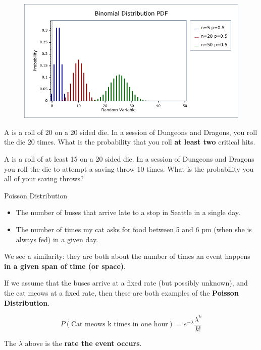 %
\begin{frame}

  \begin{figure}
    \includegraphics[scale=0.5]{binomial-pdf-changing-n}
  \end{figure}

\end{frame}
%

%
\begin{frame}

A  is a roll of 20 on a 20 sided die.  In a session of
Dungeons and Dragons, you roll the die 20 times.  What is the probability that
you roll \textbf{at least two} critical hits.

\hfill

A  is a roll of at least 15 on a 20 sided die.  In a session
of Dungeons and Dragons you roll the die to attempt a saving throw 10 times.
What is the probability you  all of your saving throws?

\end{frame}
%

%
\begin{frame}{Poisson Distribution}

\begin{itemize}
\item The number of buses that arrive late to a stop in Seattle in a single
day.
\item The number of times my cat asks for food between 5 and 6 pm (when she is
always fed) in a given day.
\end{itemize}

We see a similarity: they are both about the number of times an event happens
\textbf{in a given span of time (or space)}.
\end{frame}
%

%
\begin{frame}
If we assume that the buses arrive at a fixed rate (but possibly unknown), and
the cat meows at a fixed rate, then these are both examples of the
\textbf{Poisson Distribution}.

$$ P(\text{Cat meows k times in one hour}) = e^{-\lambda} \frac{\lambda^k}{k!}
$$

The $\lambda$ above is the \textbf{rate the event occurs}.
\end{frame}
%

